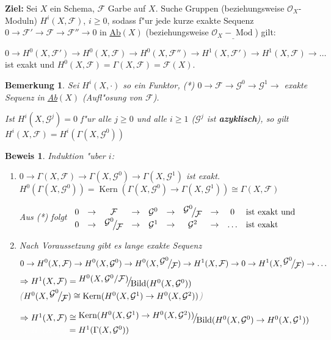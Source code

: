 \documentclass[paper = A4, fontsize=12pt, numbers=noendperiod, chapterprefix=true]{scrbook}
\theoremstyle{break}
\newtheorem{Bem}[Def]{Bemerkung}
\theoremstyle{nonumberbreak}
\newtheorem{bew}{Beweis}
\theoremstyle{nonumberplain}
\newcommand{\quot}[1]{\textrm{\glqq}{#1}\textrm{\grqq}}
\newcommand{\emp}[1]{\textbf{\emph{#1}}}
\newcommand{\defterm}[1]{{\index{#1}}\emp{#1}}
\DeclareMathOperator{\Bild}{Bild}
\DeclareMathOperator{\Kern}{Kern}
\DeclareMathOperator{\Mod}{Mod}
\newcommand{\calF}{\mathcal{F}}
\newcommand{\calG}{\mathcal{G}}
\newcommand{\calO}{\mathcal{O}}
\newcommand{\FakRaum}[2]{
	\raisebox{0.7ex}{\ensuremath{#1}}
	\ensuremath{\mkern-3mu}\big/\ensuremath{\mkern-3mu}
	\raisebox{-0.6ex}{\ensuremath{#2}}}
\begin{document}
\textbf{Ziel:} Sei $X$ ein Schema, $\calF$ Garbe auf $X$. Suche Gruppen (beziehungsweise $\calO_X$-Moduln) $H^i(X, \calF)$, $i \ge 0$, sodass f"ur jede kurze exakte Sequenz $0 \to \calF' \to \calF \to \calF'' \to 0$ in \underline{Ab$(X)$} (beziehungsweise $\underline{\calO_X-\Mod}$) gilt:

$0 \to H^0(X, \calF') \to H^0(X, \calF) \to H^0(X, \calF'') \to H^1(X, \calF') \to H^1(X, \calF) \to \ldots$ ist exakt und $H^0(X, \calF) = \Gamma(X, \calF) = \calF(X)$.

\begin{Bem}
Sei $H^i(X,\cdot)$ so ein Funktor, (*) $0 \to \calF \to \calG^0 \to \calG^1 \to$ exakte Sequenz in \underline{Ab$(X)$} (\quot{Aufl"osung von $\calF$}).

Ist $H^i(X, \calG^j) = 0$ f"ur alle $j \ge 0$ und alle $i \ge 1$ ($\calG^j$ ist \defterm{azyklisch}), so gilt $H^i(X, \calF) = H^i(\Gamma(X, \calG^0))$
\end{Bem}

\begin{bew}
Induktion "uber $i$:\begin{enumerate}[$a = 0$:]
\item[$i = 0$:]
	$0 \to \Gamma(X, \calF) \to \Gamma(X, \calG^0) \to \Gamma(X, \calG^1)$ ist exakt.\\
	$H^0(\Gamma(X, \calG^0)) = \Kern (\Gamma(X, \calG^0) \to \Gamma(X, \calG^1)) \cong \Gamma(X, \calF)$
	
	Aus (*) folgt $\begin{array}{cccccccccl} 0 &\to& \calF &\to& \calG^0 &\to& \FakRaum{\calG^0}{\calF} &\to& 0 & \text{ist exakt und} \\
		0 &\to& \FakRaum{\calG^0}{\calF} &\to& \calG^1 &\to& \calG^2 &\to& \ldots & \text{ist exakt}\end{array}$
\item[$i = 1$:]
	Nach Voraussetzung gibt es lange exakte Sequenz
		\[ 0  \to H^0(X, \calF) \to H^0(X, \calG^0) \to H^0(X, \FakRaum{\calG^0}{\calF}) \to H^1(X, \calF) \to 0 \to H^1(X, \FakRaum{\calG^0}{\calF}) \to \ldots  \]
		$\Rightarrow H^1(X, \calF) = \FakRaum{H^0(X, \calG^0/\calF)}{\Bild(H^0(X, \calG^0))}$\\
		\textcolor{gray}{($H^0(X, \FakRaum{\calG^0}{\calF}) \cong \Kern(H^0(X, \calG^1) \to H^0(X, \calG^2))$)}
		
		$\Rightarrow H^1(X, \calF) \cong \FakRaum{\Kern( H^0(X, \calG^1) \to H^0(X, \calG^2))}{\Bild( H^0(X, \calG^0) \to H^0(X, \calG^1))}$\\
		$\textcolor{white}{\Rightarrow H^1(X, \calF)} = H^1(\Gamma(X, \calG^0))$
\end{enumerate}\end{bew}
\end{document}
